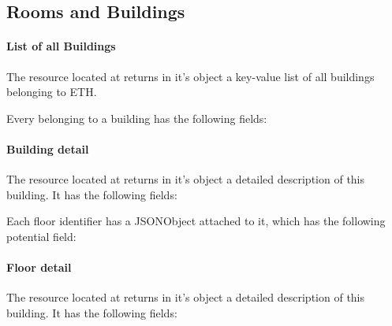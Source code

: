 \subsection{Rooms and Buildings}

\paragraph{List of all Buildings}
The resource located at  returns in it's  object a key-value list of all buildings belonging to ETH.
\begin{description}
\end{description}
Every  belonging to a building has the following fields:
\begin{description}
\end{description}

\paragraph{Building detail}
The resource located at  returns in it's  object a detailed description of this building. It has the following fields:
\begin{description}
\end{description}
Each floor identifier has a JSONObject attached to it, which has the following potential field:
\begin{description}
\end{description}

\paragraph{Floor detail}
The resource located at  returns in it's  object a detailed description of this building. It has the following fields:
